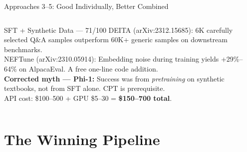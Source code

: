 \documentclass[aspectratio=169,11pt]{beamer}
\begin{document}
\begin{frame}[shrink=18]{Approaches 3--5: Good Individually, Better Combined}
\begin{columns}[T]
\vspace{4pt}
\begin{block}{SFT + Synthetic Data --- 71/100}
  \scriptsize\RaggedRight
  DEITA (arXiv:2312.15685): 6K carefully selected Q\&A samples
  outperform 60K+ generic samples on downstream benchmarks.\\[2pt]
  NEFTune (arXiv:2310.05914): Embedding noise during training yields
  +29\%--64\% on AlpacaEval.  A free one-line code addition.\\[2pt]
  \textbf{Corrected myth --- Phi-1:} Success was from \emph{pretraining}
  on synthetic textbooks, not from SFT alone.  CPT is prerequisite.\\[2pt]
  API cost: \$100--500 + GPU \$5--30 = \textbf{\$150--700 total}.
\end{block}

\end{columns}
\end{frame}

\section{The Winning Pipeline}
\end{document}
